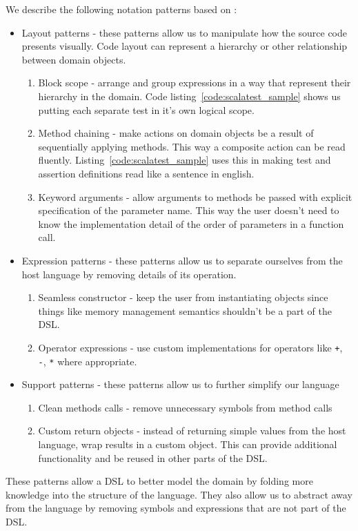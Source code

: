 We describe the following notation patterns based on \autocite{Gunther:2011}:
\begin{itemize}
	\item Layout patterns - these patterns allow us to manipulate how the source code presents visually. Code layout can represent a hierarchy or other relationship between domain objects.
	\begin{enumerate}
		\item Block scope - arrange and group expressions in a way that represent their hierarchy in the domain. Code listing~\ref{code:scalatest_sample} shows us putting each separate test in it's own logical scope.
		\item Method chaining - make actions on domain objects be a result of sequentially applying methods. This way a composite action can be read fluently. Listing~\ref{code:scalatest_sample} uses this in making test and assertion definitions read like a sentence in english.
		\item Keyword arguments - allow arguments to methods be passed with explicit specification of the parameter name. This way the user doesn't need to know the implementation detail of the order of parameters in a function call.
	\end{enumerate}
	\item Expression patterns - these patterns allow us to separate ourselves from the host language by removing details of its operation.
	\begin{enumerate}
		\item Seamless constructor - keep the user from instantiating objects since things like memory management semantics shouldn't be a part of the DSL.
		\item Operator expressions - use custom implementations for operators like \texttt{+}, \texttt{-}, \texttt{*} where appropriate.
	\end{enumerate}
	\item Support patterns - these patterns allow us to further simplify our language
	\begin{enumerate}
		\item Clean methods calls - remove unnecessary symbols from method calls
		\item Custom return objects - instead of returning simple values from the host language, wrap results in a custom object. This can provide additional functionality and be reused in other parts of the DSL.
	\end{enumerate}
\end{itemize}

These patterns allow a DSL to better model the domain by folding more knowledge into the structure of the language. They also allow us to abstract away from the language by removing symbols and expressions that are not part of the DSL.
